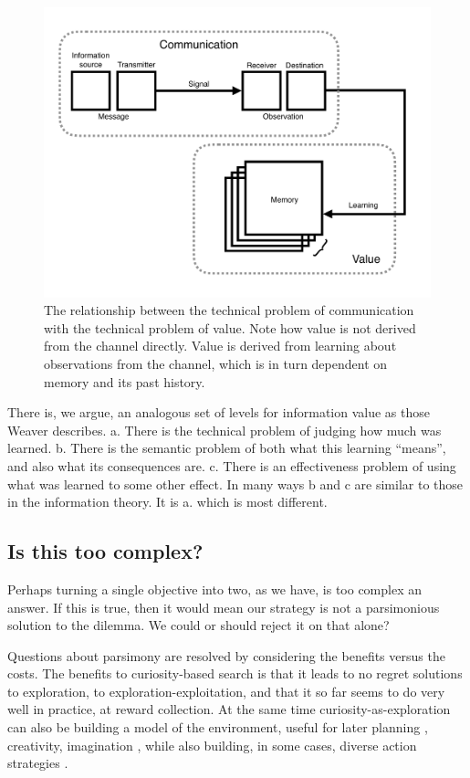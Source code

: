 \begin{figure}
	\includegraphics[width=1.0\linewidth]{img/info_diagram.pdf} 
    \caption{The relationship between the technical problem of communication with the technical problem of value. Note how value is not derived from the channel directly. Value is derived from learning about observations from the channel, which is in turn dependent on memory and its past history.
    }
    \label{fig:info1} 
\end{figure}

There is, we argue, an analogous set of levels for information value as those Weaver describes. a. There is the technical problem of judging how much was learned. b. There is the semantic problem of both what this learning ``means'', and also what its consequences are. c. There is an effectiveness problem of using what was learned to some other effect. In many ways b and c are similar to those in the information theory. It is a. which is most different. 


\subsection*{Is this too complex?}
Perhaps turning a single objective into two, as we have, is too complex an answer. If this is true, then it would mean our strategy is not a parsimonious solution to the dilemma. We could or should reject it on that alone?

Questions about parsimony are resolved by considering the benefits versus the costs. The benefits to curiosity-based search is that it leads to no regret solutions to exploration, to exploration-exploitation, and that it so far seems to do very well in practice, at reward collection. At the same time curiosity-as-exploration can also be building a model of the environment, useful for later planning \cite{Ahilan2019,Poucet1993}, creativity, imagination \cite{Schmidhuber2010}, while also building, in some cases, diverse action strategies \cite{Lehman2011a,Lehman2013,Mouret2015,Colas2020}. 

